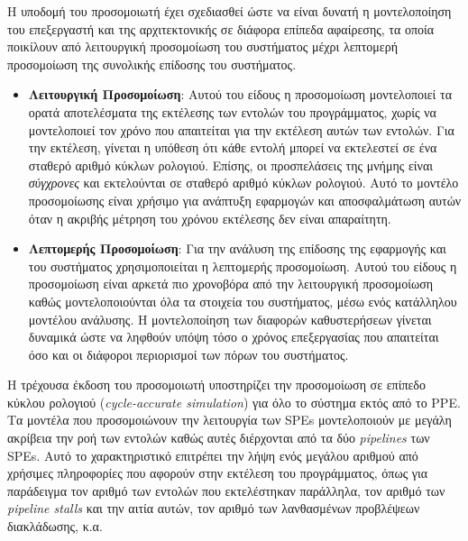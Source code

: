 \indent
Η υποδομή του προσομοιωτή έχει σχεδιασθεί ώστε να είναι δυνατή η μοντελοποίηση του επεξεργαστή και της αρχιτεκτονικής σε διάφορα επίπεδα αφαίρεσης, τα οποία ποικίλουν από λειτουργική προσομοίωση του συστήματος μέχρι λεπτομερή προσομοίωση της συνολικής επίδοσης του συστήματος.
\begin{itemize}

\item{\textbf{Λειτουργική Προσομοίωση}: Αυτού του είδους η προσομοίωση μοντελοποιεί τα ορατά αποτελέσματα της εκτέλεσης των εντολών του προγράμματος, χωρίς να μοντελοποιεί τον χρόνο που απαιτείται για την εκτέλεση αυτών των εντολών. Για την εκτέλεση, γίνεται η υπόθεση ότι κάθε εντολή μπορεί να εκτελεστεί σε ένα σταθερό αριθμό κύκλων ρολογιού. Επίσης, οι προσπελάσεις της μνήμης είναι \textsl{σύγχρονες} και εκτελούνται σε σταθερό αριθμό κύκλων ρολογιού. Αυτό το μοντέλο προσομοίωσης είναι χρήσιμο για ανάπτυξη εφαρμογών και αποσφαλμάτωση αυτών όταν η ακριβής μέτρηση του χρόνου εκτέλεσης δεν είναι απαραίτητη.}

\item{\textbf{Λεπτομερής Προσομοίωση}: Για την ανάλυση της επίδοσης της εφαρμογής και του συστήματος χρησιμοποιείται η λεπτομερής προσομοίωση. Αυτού του είδους η προσομοίωση είναι αρκετά πιο χρονοβόρα από την λειτουργική προσομοίωση καθώς μοντελοποιούνται όλα τα στοιχεία του συστήματος, μέσω ενός κατάλληλου μοντέλου ανάλυσης. Η μοντελοποίηση των διαφορών καθυστερήσεων γίνεται δυναμικά ώστε να ληφθούν υπόψη τόσο ο χρόνος επεξεργασίας που απαιτείται όσο και οι διάφοροι περιορισμοί των πόρων του συστήματος.}

\end{itemize}
\indent
Η τρέχουσα έκδοση του προσομοιωτή υποστηρίζει την προσομοίωση σε επίπεδο κύκλου ρολογιού (\textsl{cycle-accurate simulation}) για όλο το σύστημα εκτός από το \ac{PPE}. Τα μοντέλα που προσομοιώνουν την λειτουργία των \acp{SPE} μοντελοποιούν με μεγάλη ακρίβεια την ροή των εντολών καθώς αυτές διέρχονται από τα δύο \textsl{pipelines} των \acp{SPE}. Αυτό το χαρακτηριστικό επιτρέπει την λήψη ενός μεγάλου αριθμού από χρήσιμες πληροφορίες που αφορούν στην εκτέλεση του προγράμματος, όπως για παράδειγμα τον αριθμό των εντολών που εκτελέστηκαν παράλληλα, τον αριθμό των \textsl{pipeline stalls} και την αιτία αυτών, τον αριθμό των λανθασμένων προβλέψεων διακλάδωσης, κ.α.

